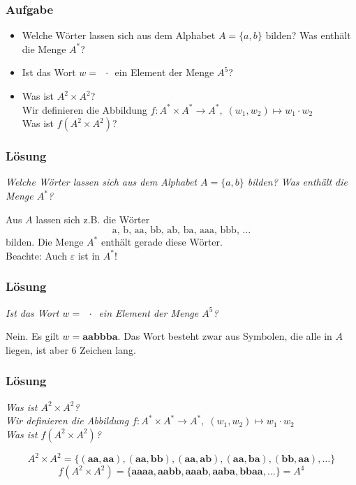\begin{frame}
	\frametitle{Aufgabe}
	\begin{itemize}
		\item Welche Wörter lassen sich aus dem Alphabet $A = \{a , b \}$ bilden? Was enthält die Menge $A^*$?
		\item Ist das Wort $w =$ $\,\cdot\,$ ein Element der Menge $A^5$?
		\item Was ist $A^2 \times A^2$? \\
			Wir definieren die Abbildung $f : A^* \times A^* \to A^*, \; (w_1, w_2) \mapsto w_1 \cdot w_2$ \\
			Was ist $f(A^2 \times A^2)$?
	\end{itemize}
\end{frame}

\begin{frame}
	\frametitle{Lösung}
	\textit{Welche Wörter lassen sich aus dem Alphabet $A = \{a , b \}$ bilden? Was enthält die Menge $A^*$?} \\[2em] \pause
	
	Aus $A$ lassen sich z.B. die Wörter $$\text{a, b, aa, bb, ab, ba, aaa, bbb, }\dots$$ bilden. Die Menge $A^*$ enthält gerade diese Wörter.\\
	\pause
	Beachte: Auch $\varepsilon$ ist in $A^*$!
\end{frame}

\begin{frame}
	\frametitle{Lösung}
	\textit{Ist das Wort $w =$ $\,\cdot\,$ ein Element der Menge $A^5$?} \\[2em] \pause
	
	Nein. Es gilt $w = \textbf{aabbba}$. Das Wort besteht zwar aus Symbolen, die alle in $A$ liegen, ist aber 6 Zeichen lang.
\end{frame}

\begin{frame}
	\frametitle{Lösung}
	\textit{Was ist $A^2 \times A^2$? \\
		Wir definieren die Abbildung $f : A^* \times A^* \to A^*, \; (w_1, w_2) \mapsto w_1 \cdot w_2$ \\
		Was ist $f(A^2 \times A^2)$?} \\[2em]  \pause
	
	 $$ A^2 \times A^2 = \{\mathbf{(aa,aa),(aa,bb),(aa,ab),(aa,ba),(bb,aa),} \dots \}$$
	 \pause
	 $$ f(A^2 \times A^2) = \{\mathbf{aaaa, aabb, aaab, aaba, bbaa,} \dots \} = A^4 $$
\end{frame}